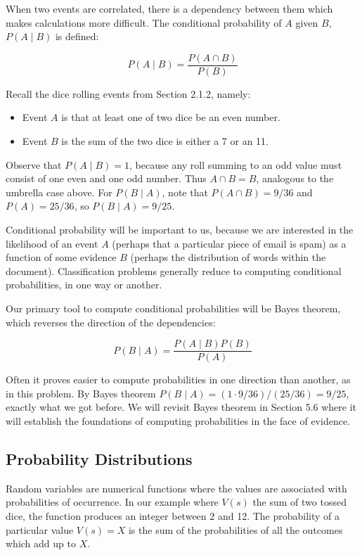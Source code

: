 \documentclass[10pt]{article}
\begin{document}
When two events are correlated, there is a dependency between them which makes calculations more difficult. The conditional probability of \(A\) given \(B\), \(P(A \mid B)\) is defined:

\[ P(A \mid B) = \frac{P(A \cap B)}{P(B)} \]

Recall the dice rolling events from Section 2.1.2, namely:

\begin{itemize}
    \item Event \(A\) is that at least one of two dice be an even number.
    \item Event \(B\) is the sum of the two dice is either a 7 or an 11.
\end{itemize}

Observe that \(P(A \mid B)=1\), because any roll summing to an odd value must consist of one even and one odd number. Thus \(A \cap B = B\), analogous to the umbrella case above. For \(P(B \mid A)\), note that \(P(A \cap B) = 9/36\) and \(P(A) = 25/36\), so \(P(B \mid A) = 9/25\).

Conditional probability will be important to us, because we are interested in the likelihood of an event \(A\) (perhaps that a particular piece of email is spam) as a function of some evidence \(B\) (perhaps the distribution of words within the document). Classification problems generally reduce to computing conditional probabilities, in one way or another.

Our primary tool to compute conditional probabilities will be Bayes theorem, which reverses the direction of the dependencies:

\[ P(B \mid A) = \frac{P(A \mid B) P(B)}{P(A)} \]

Often it proves easier to compute probabilities in one direction than another, as in this problem. By Bayes theorem \(P(B \mid A) = (1 \cdot 9 / 36) / (25 / 36) = 9 / 25\), exactly what we got before. We will revisit Bayes theorem in Section 5.6 where it will establish the foundations of computing probabilities in the face of evidence.

\subsection*{Probability Distributions}

Random variables are numerical functions where the values are associated with probabilities of occurrence. In our example where \(V(s)\) the sum of two tossed dice, the function produces an integer between 2 and 12. The probability of a particular value \(V(s)=X\) is the sum of the probabilities of all the outcomes which add up to \(X\).
\end{document}
